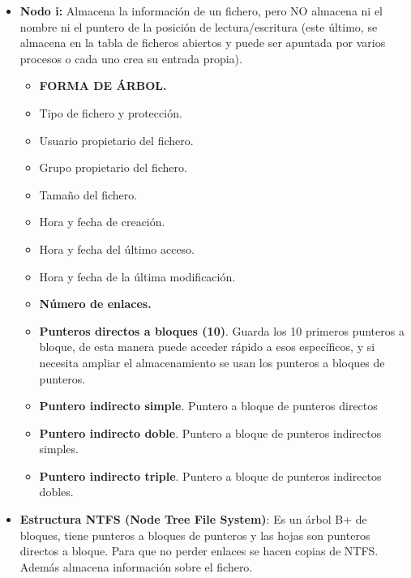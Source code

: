 \documentclass[12pt, twoside, openright]{report} %
\begin{document}
\begin{itemize}
\begin{itemize}
    \item \textbf{Nodo i:} Almacena la información de un fichero, pero NO
      almacena ni el nombre ni el puntero de la posición de
      lectura/escritura (este último, se almacena en la tabla de
      ficheros abiertos y puede ser apuntada por varios procesos o cada
      uno crea su entrada propia).
      

      \begin{itemize}
      \item \textbf{FORMA DE ÁRBOL.}
        
      \item Tipo de fichero y protección.
        
      \item Usuario propietario del fichero.
        
      \item Grupo propietario del fichero.
        
      \item Tamaño del fichero.
        
      \item Hora y fecha de creación.
        
      \item Hora y fecha del último acceso.
        
      \item Hora y fecha de la última modificación.
        
      \item \textbf{Número de enlaces.}
        
      \item \textbf{Punteros directos a bloques (10)}. Guarda los 10
        primeros punteros a bloque, de esta manera puede acceder rápido
        a esos específicos, y si necesita ampliar el almacenamiento se
        usan los punteros a bloques de punteros.
        
      \item \textbf{Puntero indirecto simple}. Puntero a bloque de punteros
        directos
        
      \item \textbf{Puntero indirecto doble}. Puntero a bloque de punteros
        indirectos simples.
        
      \item \textbf{Puntero indirecto triple}. Puntero a bloque de punteros
        indirectos dobles.
        
      \end{itemize}
    \item \textbf{Estructura NTFS (Node Tree File System)}: Es un árbol B+
      de bloques, tiene punteros a bloques de punteros y las hojas son
      punteros directos a bloque. Para que no perder enlaces se hacen
      copias de NTFS. Además almacena información sobre el fichero.
      
    \end{itemize}
  \end{itemize}
\end{document}
